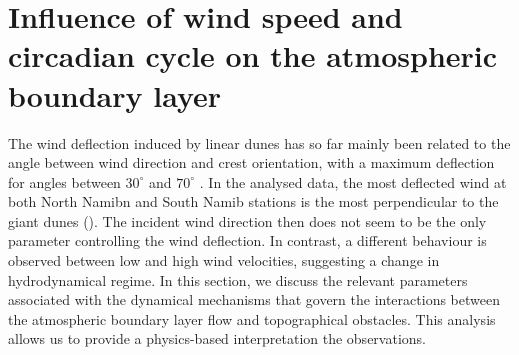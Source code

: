 \section{Influence of wind speed and circadian cycle on the atmospheric boundary layer}
The wind deflection induced by linear dunes has so far mainly been related to the angle between wind direction and crest orientation, with a maximum deflection for angles between $30^{\circ}$ and $70^{\circ}$ \citep{Walker2009, Hesp2015}. In the analysed data, the most deflected wind at both North Namibn and South Namib stations is the most perpendicular to the giant dunes (). The incident wind direction then does not seem to be the only parameter controlling the wind deflection. In contrast, a different behaviour is observed between low and high wind velocities, suggesting a change in hydrodynamical regime. In this section, we discuss the relevant parameters associated with the dynamical mechanisms that govern the interactions between the atmospheric boundary layer flow and topographical obstacles. This analysis allows us to provide a physics-based interpretation the observations.


